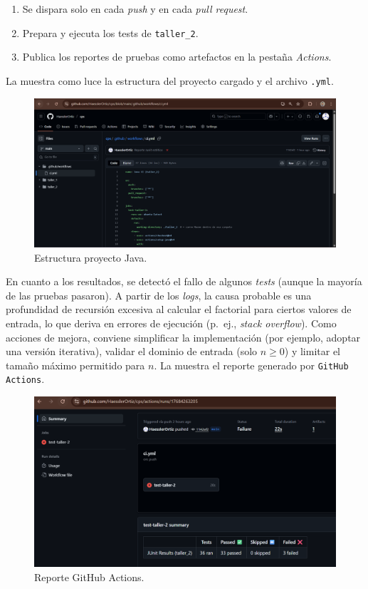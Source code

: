 \documentclass[12pt,a4paper]{article}
\begin{document}
\begin{enumerate}
  \item Se dispara solo en cada \textit{push} y en cada \textit{pull request}.
  \item Prepara y ejecuta los tests de \texttt{taller\_2}.
  \item Publica los reportes de pruebas como artefactos en la pestaña \textit{Actions}.
\end{enumerate}

La  muestra como luce la estructura del proyecto cargado y el archivo \texttt{.yml}.

\begin{figure}[H]
  \centering
  \includegraphics[width=\textwidth]{actions.png}
  \caption{Estructura proyecto Java.}
  \label{fig:actions}
\end{figure}

En cuanto a los resultados, se detectó el fallo de algunos \textit{tests} (aunque la mayoría de las pruebas pasaron). 
A partir de los \textit{logs}, la causa probable es una profundidad de recursión excesiva al calcular el factorial para 
ciertos valores de entrada, lo que deriva en errores de ejecución (p.~ej., \textit{stack overflow}). Como 
acciones de mejora, conviene simplificar la implementación (por ejemplo, adoptar una versión iterativa), validar 
el dominio de entrada (solo $n \geq 0$) y limitar el tamaño máximo permitido para $n$. La  muestra 
el reporte generado por \texttt{GitHub Actions}.

\begin{figure}[H]
  \centering
  \includegraphics[width=\textwidth]{test.png}
  \caption{Reporte GitHub Actions.}
  \label{fig:test}
\end{figure}
\end{document}
